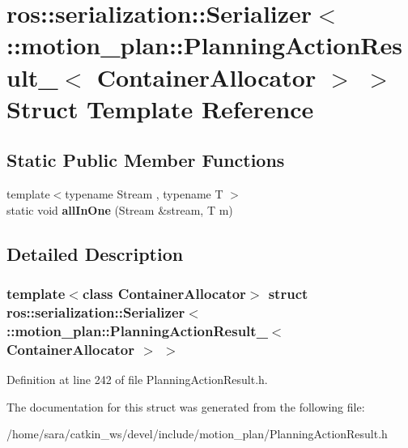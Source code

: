 \hypertarget{structros_1_1serialization_1_1Serializer_3_01_1_1motion__plan_1_1PlanningActionResult___3_01ContainerAllocator_01_4_01_4}{}\section{ros\+:\+:serialization\+:\+:Serializer$<$ \+:\+:motion\+\_\+plan\+:\+:Planning\+Action\+Result\+\_\+$<$ Container\+Allocator $>$ $>$ Struct Template Reference}
\label{structros_1_1serialization_1_1Serializer_3_01_1_1motion__plan_1_1PlanningActionResult___3_01ContainerAllocator_01_4_01_4}
\subsection*{Static Public Member Functions}
\begin{DoxyCompactItemize}
\item 
\mbox{\label{structros_1_1serialization_1_1Serializer_3_01_1_1motion__plan_1_1PlanningActionResult___3_01ContainerAllocator_01_4_01_4_abc3edee4478568361282f627fdf1b383}} 
{\footnotesize template$<$typename Stream , typename T $>$ }\\static void {\bfseries all\+In\+One} (Stream \&stream, T m)
\end{DoxyCompactItemize}


\subsection{Detailed Description}
\subsubsection*{template$<$class Container\+Allocator$>$\newline
struct ros\+::serialization\+::\+Serializer$<$ \+::motion\+\_\+plan\+::\+Planning\+Action\+Result\+\_\+$<$ Container\+Allocator $>$ $>$}



Definition at line 242 of file Planning\+Action\+Result.\+h.



The documentation for this struct was generated from the following file\+:\begin{DoxyCompactItemize}
\item 
/home/sara/catkin\+\_\+ws/devel/include/motion\+\_\+plan/Planning\+Action\+Result.\+h\end{DoxyCompactItemize}
